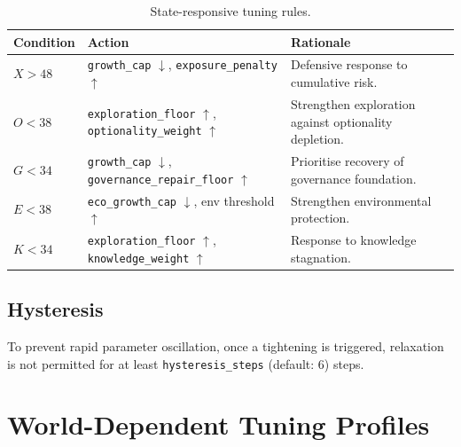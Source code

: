 \begin{table}[ht]
\centering
\small
\begin{tabularx}{\linewidth}{lXX}
\toprule
\textbf{Condition} & \textbf{Action} & \textbf{Rationale} \\
\midrule
$X > 48$
& \texttt{growth\_cap} $\downarrow$,
\texttt{exposure\_penalty} $\uparrow$
& Defensive response to cumulative risk. \\

$O < 38$
& \texttt{exploration\_floor} $\uparrow$,
\texttt{optionality\_weight} $\uparrow$
& Strengthen exploration against optionality depletion. \\

$G < 34$
& \texttt{growth\_cap} $\downarrow$,
\texttt{governance\_repair\_floor} $\uparrow$
& Prioritise recovery of governance foundation. \\

$E < 38$
& \texttt{eco\_growth\_cap} $\downarrow$,
env threshold $\uparrow$
& Strengthen environmental protection. \\

$K < 34$
& \texttt{exploration\_floor} $\uparrow$,
\texttt{knowledge\_weight} $\uparrow$
& Response to knowledge stagnation. \\

\bottomrule
\end{tabularx}
\caption[State-responsive tuning rules]{State-responsive tuning
rules.}
\label{tab:vnext-tuning-rules}
\end{table}

\subsection{Hysteresis}
\label{sec:vnext-hysteresis}

To prevent rapid parameter oscillation, once a tightening is
triggered, relaxation is not permitted for at least
\texttt{hysteresis\_steps} (default: 6) steps.

\section{World-Dependent Tuning Profiles}
\label{sec:vnext-world-profiles}

